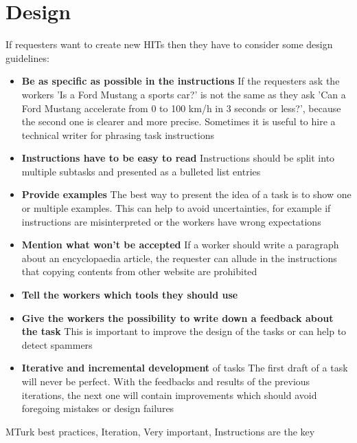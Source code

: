 \section{Design}
If requesters want to create new HITs then they have to consider some design guidelines\cite{crowdsourcing_tutorial,mturk_bestpractices}: 
\begin{itemize}
\item \textbf{Be as specific as possible in the instructions} If the requesters ask the workers 'Is a Ford Mustang a sports car?' is not the same as they ask 'Can a Ford Mustang accelerate from 0 to 100 km/h in 3 seconds or less?', because the second one is clearer and more precise. Sometimes it is useful to hire a technical writer for phrasing task instructions 
\item \textbf{Instructions have to be easy to read} Instructions should be split into multiple subtasks and presented as a bulleted list entries 
\item \textbf{Provide examples} The best way to present the idea of a task is to show one or multiple examples. This can help to avoid uncertainties, for example if instructions are misinterpreted or the workers have wrong expectations 
\item \textbf{Mention what won't be accepted} If a worker should write a paragraph about an encyclopaedia article, the requester can allude in the instructions that copying contents from other website are prohibited
\item \textbf{Tell the workers which tools they should use} 
\item \textbf{Give the workers the possibility to write down a feedback about the task} This is important to improve the design of the tasks or can help to detect spammers 
\item \textbf{Iterative and incremental development} of tasks The first draft of a task will never be perfect. With the feedbacks and results of the previous iterations, the next one will contain improvements which should avoid foregoing mistakes or design failures
\end{itemize}
MTurk best practices, Iteration, Very important, Instructions are the key

